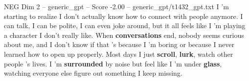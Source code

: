\begin{textsample}{NEG Dim 2 – generic\_gpt – Score -2.00 – generic\_gpt/t1432\_gpt.txt}  \label{ex:f2_neg_010}
I ’m starting to realize I don't actually know how to connect with people anymore.
I can talk, I can be polite, I can even joke around, but it all feels like I ’m playing a character I don't really like.
When \textbf{conversations} end, nobody seems curious about me, and I don't know if that ’s because I ’m boring or because I never learned how to open up properly.
Most days I just \textbf{scroll}, \textbf{lurk}, watch other people ’s lives.
I ’m \textbf{surrounded} by noise but feel like I ’m under \textbf{glass}, watching everyone else figure out something I keep missing.

\end{textsample}

